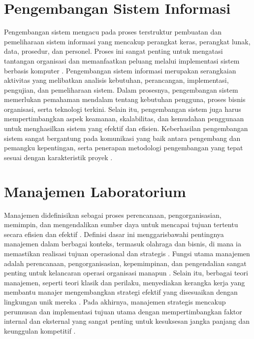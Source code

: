 
\section{Pengembangan Sistem Informasi}
Pengembangan sistem mengacu pada proses terstruktur pembuatan dan pemeliharaan sistem informasi yang mencakup perangkat keras, perangkat lunak, data, prosedur, dan personel. Proses ini sangat penting untuk mengatasi tantangan organisasi dan memanfaatkan peluang melalui implementasi sistem berbasis komputer \cite{efendi2023perkembangan}. Pengembangan sistem informasi merupakan serangkaian aktivitas yang melibatkan analisis kebutuhan, perancangan, implementasi, pengujian, dan pemeliharaan sistem. Dalam prosesnya, pengembangan sistem memerlukan pemahaman mendalam tentang kebutuhan pengguna, proses bisnis organisasi, serta teknologi terkini. Selain itu, pengembangan sistem juga harus mempertimbangkan aspek keamanan, skalabilitas, dan kemudahan penggunaan untuk menghasilkan sistem yang efektif dan efisien. Keberhasilan pengembangan sistem sangat bergantung pada komunikasi yang baik antara pengembang dan pemangku kepentingan, serta penerapan metodologi pengembangan yang tepat sesuai dengan karakteristik proyek \cite{efendi2023perkembangan}.

\section{Manajemen Laboratorium}
Manajemen didefinisikan sebagai proses perencanaan, pengorganisasian, memimpin, dan mengendalikan sumber daya untuk mencapai tujuan tertentu secara efisien dan efektif \cite{kaehler2019concept}. Definisi dasar ini menggarisbawahi pentingnya manajemen dalam berbagai konteks, termasuk olahraga dan bisnis, di mana ia memastikan realisasi tujuan operasional dan strategis \cite{kaehler2019concept}. Fungsi utama manajemen adalah perencanaan, pengorganisasian, kepemimpinan, dan pengendalian sangat penting untuk kelancaran operasi organisasi manapun \cite{feng2009internal}. Selain itu, berbagai teori manajemen, seperti teori klasik dan perilaku, menyediakan kerangka kerja yang membantu manajer mengembangkan strategi efektif yang disesuaikan dengan lingkungan unik mereka \cite{hussain2019management}. Pada akhirnya, manajemen strategis mencakup perumusan dan implementasi tujuan utama dengan mempertimbangkan faktor internal dan eksternal yang sangat penting untuk kesuksesan jangka panjang dan keunggulan kompetitif \cite{schuhly2022strategic}.

